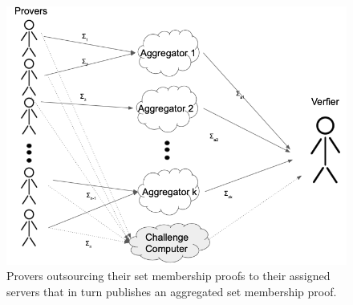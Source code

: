  \begin{figure}
\includegraphics[width=\linewidth]{./figure/flowmultiple.png}
\caption{Provers outsourcing their set membership proofs to their assigned servers that in turn publishes an aggregated set membership proof. }
\label{fig:workflow}
\end{figure} 





